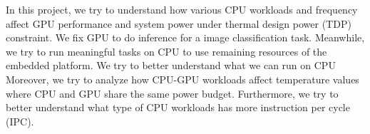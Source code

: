 In this project, we try to understand how various CPU workloads and frequency affect GPU performance and system power under thermal design power (TDP) constraint. We fix GPU to do inference for a image classification task. Meanwhile, we try to run meaningful tasks on CPU to use remaining resources of the embedded platform. We try to better understand what we can run on CPU Moreover, we try to analyze how CPU-GPU workloads affect temperature values where CPU and GPU share the same power budget. Furthermore, we try to better understand what type of CPU workloads has more instruction per cycle (IPC). 